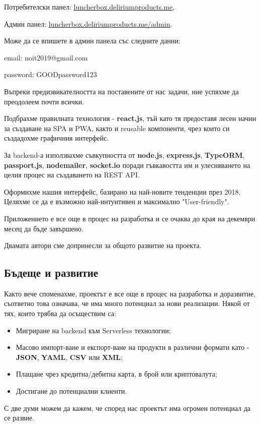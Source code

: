 \documentclass[a4paper]{article}
\begin{document}
\begin{Large}
Потребителски панел: \href{https://luncherbox.deliriumproducts.me}{\underline{luncherbox.deliriumproducts.me}}, 

Админ панел: \href{https://luncherbox.deliriumproducts.me/admin}{\underline{luncherbox.deliriumproducts.me/admin}}. 

Може да се впишете в админ панела със следните данни: 

email: noit2019@gmail.com

password: GOODpassword123
 
Въпреки предизвикателността на поставените от нас задачи, ние успяхме да преодолеем почти всички. 

Подбрахме правилната технология - \textbf{react.js}, тъй като тя предоставя лесен начин за създаване на SPA и PWA, както и reusable компоненти, чрез които си създадохме графичния интерфейс. 

За backend-а използвахме съвкупността от  \textbf{node.js}, \textbf{express.js}, \textbf{TypeORM}, \textbf{passport.js}, \textbf{nodemailer}, \textbf{socket.io} поради гъвкавостта им и улесняването на целия процес на създаването на REST API. 

Оформихме нашия интерфейс, базирано на най-новите тенденции през 2018. Целяхме се да е възможно най-интуитивен и максимално "User-friendly".

Приложението е все още в процес на разработка и се очаква до края на декември месец да бъде завършено. 

Двамата автори сме допринесли за общото развитие на проекта. 

\subsection{Бъдеще и развитие}

Както вече споменахме, проектът е все още в процес на разработка и доразвитие, съответно това означава, че има много потенциал за нови реализации. Някой от тях, които трябва да осъществим са:

\begin{itemize}
\item Мигриране на backend към Serverless технологии; \unsure
\item Масово импорт-ване и експорт-ване на продукти в различни формати като - \textbf{JSON}, \textbf{YAML}, \textbf{CSV} или \textbf{XML};
\item Плащане чрез кредитна/дебитна карта, в брой или криптовалута;
\item Достигане до потенциални клиенти.
\end{itemize}

С две думи можем да кажем, че според нас проектът има огромен
потенциал да се развие.

\end{Large}
\end{document}
